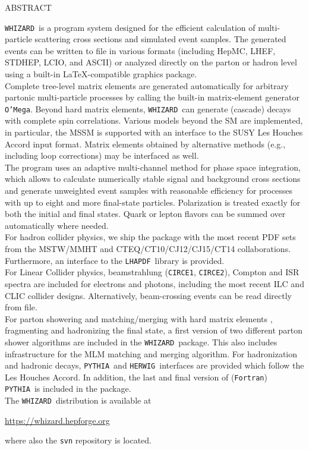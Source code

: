 \documentclass[12pt]{book}
\makeatletter
\newif\if@preliminary
\def\abstract#1{\def\@abstract{#1}}
\newcommand\abstractname{ABSTRACT}
\newlength\preprintnoskip
\newlength\abstractwidth
\renewcommand\maketitle{\begin{titlepage}%
  \let\footnotesize\small
  \hfill\parbox{\preprintnoskip}{%
  \begin{flushright}\@preprintno\end{flushright}}\hspace*{1cm}
  \vskip 60\p@
  \begin{center}%
    {\Large\bf\boldmath \@title \par}\vskip 1cm%
    {\sc\@author \par}\vskip 3mm%
    {\@address \par}%
    \if@preliminary
      \vskip 2cm {\large\sf PRELIMINARY DRAFT \par \@date}%
    \fi
  \end{center}\par
  \@thanks
  \vfill
  \begin{center}%
    \parbox{\abstractwidth}{\centerline{\abstractname}%
    \vskip 3mm%
    \@abstract}
  \end{center}
  \end{titlepage}%
  \setcounter{footnote}{0}%
  \let\thanks\relax\let\maketitle\relax
  \gdef\@thanks{}\gdef\@author{}\gdef\@address{}%
  \gdef\@title{}\gdef\@abstract{}\gdef\@preprintno{}
}%
\newcommand{\ttt}[1]{\texttt{#1}}
\newcommand{\whizard}{\ttt{WHIZARD}}
\newcommand{\oMega}{\ttt{O'Mega}}
\newcommand{\herwig}{\ttt{HERWIG}}
\newcommand{\pythia}{\ttt{PYTHIA}}
\newcommand{\circeone}{\ttt{CIRCE1}}
\newcommand{\circetwo}{\ttt{CIRCE2}}
\newcommand{\lhapdf}{\ttt{LHAPDF}}
\newcommand{\fortran}{\ttt{Fortran}}
\makeatother
\begin{document}
\abstract{%
\whizard\ is a program system designed for the efficient calculation
of multi-particle scattering cross sections and simulated event
samples.  The generated events can be written to file in various formats
(including HepMC, LHEF, STDHEP, LCIO, and ASCII) or analyzed directly on the
parton or hadron level using a built-in \LaTeX-compatible graphics
package.
\\[\baselineskip]
Complete tree-level matrix elements are generated automatically for arbitrary
partonic multi-particle processes by calling the built-in matrix-element
generator \oMega.  Beyond hard matrix elements, \whizard\ can generate
(cascade) decays with complete spin correlations.
Various models beyond the SM are implemented, in particular,
the MSSM is supported with an interface to the SUSY Les Houches Accord
input format.  Matrix elements obtained by alternative methods (e.g.,
including loop corrections) may be interfaced as well.
\\[\baselineskip]
The program uses an adaptive multi-channel method for phase space
integration, which allows to calculate numerically stable signal and
background cross sections and generate unweighted event samples with
reasonable efficiency for processes with up to eight and more
final-state particles.  Polarization is treated exactly for both the
initial and final states.  Quark or lepton flavors can be
summed over automatically where needed.
\\[\baselineskip]
For hadron collider physics, we ship the package with the most recent
PDF sets from the MSTW/MMHT and CTEQ/CT10/CJ12/CJ15/CT14
collaborations. Furthermore, an interface to the \lhapdf\ library is
provided.
\\[\baselineskip]
For Linear Collider physics,
beamstrahlung (\circeone, \circetwo), Compton and ISR spectra are
included for electrons and photons, including the most recent ILC and
CLIC collider designs. Alternatively, beam-crossing events can be read
directly from file.
\\[\baselineskip]
For parton showering and matching/merging with hard matrix elements ,
fragmenting and hadronizing the final state, a first version of two
different parton shower algorithms are included in the \whizard\
package. This also includes infrastructure for the MLM matching and
merging algorithm. For hadronization and hadronic decays, \pythia\
and \herwig\ interfaces are provided which follow the Les Houches
Accord. In addition, the last and final version of (\fortran) \pythia\
is included in the package.
\\[\baselineskip]
The \whizard\ distribution is available at
\begin{center}
  \url{https://whizard.hepforge.org}
\end{center}
where also the \ttt{svn} repository is located.
}
%
\maketitle
\end{document}
